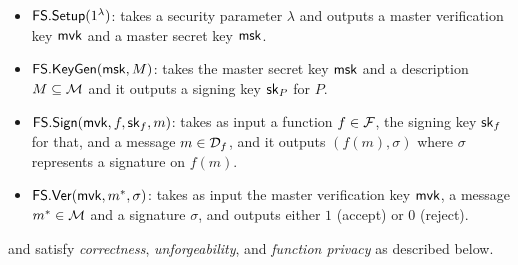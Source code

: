 \documentclass[11pt]{llncs}
\begin{document}
\begin{itemize}
\item ${\sf FS.Setup}(1^\lambda)$: takes a security parameter $\lambda$ and outputs a 
master verification key ${\sf mvk}$ and a master secret key ${\sf msk}$.

\item ${\sf FS.KeyGen}({\sf msk}, M)$: takes the master secret key ${\sf msk}$ and a description $M \subseteq {\cal M}$ and it outputs a signing key ${\sf sk}_P$ for $P$.

\item ${\sf FS.Sign}({\sf mvk}, f, {\sf sk}_f, m)$: takes as input a function $f \in {\cal F}$, the signing key
${\sf sk}_f$ for that, and a message $m \in  {\cal D}_f$, and it outputs $(f(m), \sigma)$ where
$\sigma$ represents a  signature on $f(m)$.

\item ${\sf FS.Ver}({\sf mvk},  m^*, \sigma)$: takes as input the master verification key ${\sf mvk}$,
a message $m^* \in {\cal M}$ and a signature $\sigma$, and outputs either $1$ (accept)
or $0$ (reject).
\end{itemize}
and satisfy {\em correctness}, {\em unforgeability},  and {\em function privacy}
as described below. 
\end{document}
